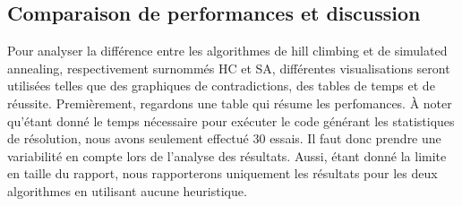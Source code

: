 \documentclass[8pt]{article}
\begin{document}
\subsection{Comparaison de performances et discussion}
Pour analyser la différence entre les algorithmes de hill climbing et de
simulated annealing, respectivement surnommés HC et SA, différentes
visualisations seront utilisées telles que des graphiques de contradictions, des
tables de temps et de réussite. Premièrement, regardons une table qui
résume les perfomances. À noter qu'étant donné le temps nécessaire pour exécuter
le code générant les statistiques de résolution,
nous avons seulement effectué 30 essais. Il faut donc prendre une
variabilité en compte lors de l'analyse des résultats. Aussi, étant donné
la limite en taille du rapport, nous rapporterons uniquement les résultats
pour les deux algorithmes en utilisant aucune heuristique.
\end{document}
